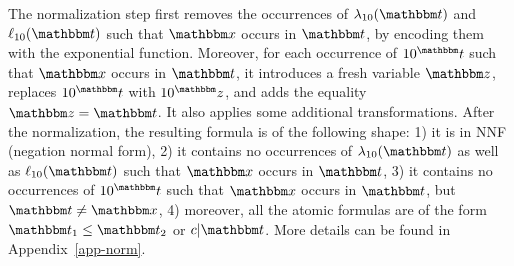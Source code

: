 The normalization step first removes the occurrences of $\lambda_{10}(\iterm)$ and $\ell_{10}(\iterm)$  such that $\ivarx$ occurs  in $\iterm$, by encoding them with the exponential function. Moreover, for each occurrence of $10^\iterm$ such that $\ivarx$ occurs in $\iterm$, it introduces a fresh variable $\ivarz$, replaces $10^\iterm$ with $10^\ivarz$, and adds the equality $\ivarz = \iterm$.  It also applies some additional transformations. After the normalization, the resulting formula is of the following shape: 1) it is in NNF (negation normal form),  2) it contains no occurrences of $\lambda_{10}(\iterm)$ as well as $\ell_{10}(\iterm)$ such that $\ivarx$ occurs in $\iterm$, 3)  it contains no occurrences of $10^\iterm$ such that $\ivarx$ occurs in $\iterm$, but $\iterm \neq \ivarx$, 4) moreover, all the atomic formulas are of the form $\iterm_1 \le \iterm_2$ or $c | \iterm$. More details can be found in Appendix~\ref{app-norm}.


